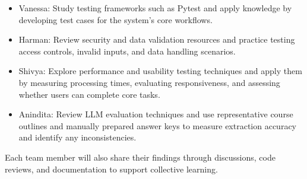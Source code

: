 \documentclass[12pt, titlepage]{article}
\begin{document}
\begin{enumerate}
\begin{itemize}
  \item Vanessa: Study testing frameworks such as Pytest and apply knowledge by developing test cases for the system's core workflows.
  \item Harman: Review security and data validation resources and practice testing access controls, invalid inputs, and data handling scenarios.
  \item Shivya: Explore performance and usability testing techniques and apply them by measuring processing times, evaluating responsiveness, and assessing whether users can complete core tasks.
  \item Anindita: Review LLM evaluation techniques and use representative course outlines and manually prepared answer keys to measure extraction accuracy and identify any inconsistencies.
\end{itemize}

Each team member will also share their findings through discussions, code reviews, and documentation to support collective learning.

\end{enumerate}
\end{document}
